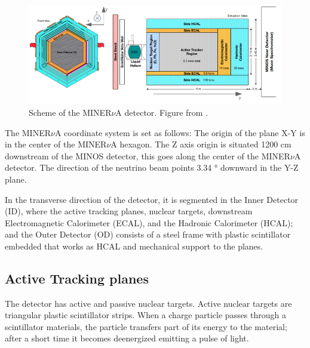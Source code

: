 \begin{figure}[!htb]
\centering
\includegraphics[scale=0.5]{Figures/Chapter2/DetectorScheme.png}

        \caption{Scheme of the MINER$\nu$A detector. Figure from \cite{MINERvA}.} 
\label{fig:MnvExp:MnvDetector:Scheme}
\end{figure}

The MINER$\nu$A coordinate system is set as follows: The origin of the plane X-Y is in the center of the MINER$\nu$A hexagon. The Z axis origin is situated 1200 cm downstream of the MINOS detector, this goes along the center of the MINER$\nu$A detector. The direction of the neutrino beam points 3.34 ° downward in the Y-Z plane. 

In the transverse direction of the detector, it is segmented in the Inner Detector (ID), where the active tracking planes, nuclear targets, downstream Electromagnetic Calorimeter (ECAL), and the Hadronic Calorimeter (HCAL); and the Outer Detector (OD) consists of a steel frame with plastic scintillator embedded that works as HCAL and mechanical support to the planes.   

\subsection{Active Tracking planes}
\label{Cap:MnvExp:MnvDetector:ActiveTrackingPlanes}

The detector has active and passive nuclear targets. Active nuclear targets are triangular plastic scintillator strips. When a charge particle passes through a scintillator materials, the particle transfers part of its energy to the material; after a short time it becomes deenergized emitting a pulse of light\cite{DetectionTechniques}. 

